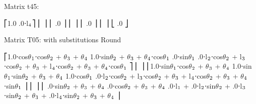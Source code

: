 \documentclass[letterpaper,10pt,english,openany,oneside]{sphinxmanual}
\begin{document}
\begin{sphinxVerbatim}[commandchars=\\\{\}]
Matrix t\PYGZus{}4\PYGZus{}5:

⎡1.0          .0⋅l\(\sb{\text{4}}\)⎤
⎢                     ⎥
⎢    .0           ⎥
⎢                     ⎥
⎢        .0       ⎥
⎢                     ⎥
⎣             .0  ⎦


Matrix T\PYGZus{}0\PYGZus{}5: with substitutions Round

⎡1.0⋅cos\(\theta\)\(\sb{\text{1}}\)⋅cos\(\theta\)\(\sb{\text{2}}\) + \(\theta\)\(\sb{\text{3}}\) + \(\theta\)\(\sb{\text{4}}\)  \PYGZhy{}1.0⋅sin\(\theta\)\(\sb{\text{2}}\) + \(\theta\)\(\sb{\text{3}}\) + \(\theta\)\(\sb{\text{4}}\)⋅cos\(\theta\)\(\sb{\text{1}}\)  .0⋅sin\(\theta\)\(\sb{\text{1}}\)      .0⋅l\(\sb{\text{2}}\)⋅cos\(\theta\)\(\sb{\text{2}}\) + l\(\sb{\text{3}}\)⋅cos\(\theta\)\(\sb{\text{2}}\) + \(\theta\)\(\sb{\text{3}}\) + l\(\sb{\text{4}}\)⋅cos\(\theta\)\(\sb{\text{2}}\) + \(\theta\)\(\sb{\text{3}}\) + \(\theta\)\(\sb{\text{4}}\)⋅cos\(\theta\)\(\sb{\text{1}}\)        ⎤
⎢                                                                                                                                                     ⎥
⎢1.0⋅sin\(\theta\)\(\sb{\text{1}}\)⋅cos\(\theta\)\(\sb{\text{2}}\) + \(\theta\)\(\sb{\text{3}}\) + \(\theta\)\(\sb{\text{4}}\)  \PYGZhy{}1.0⋅sin\(\theta\)\(\sb{\text{1}}\)⋅sin\(\theta\)\(\sb{\text{2}}\) + \(\theta\)\(\sb{\text{3}}\) + \(\theta\)\(\sb{\text{4}}\)  \PYGZhy{}1.0⋅cos\(\theta\)\(\sb{\text{1}}\)     .0⋅l\(\sb{\text{2}}\)⋅cos\(\theta\)\(\sb{\text{2}}\) + l\(\sb{\text{3}}\)⋅cos\(\theta\)\(\sb{\text{2}}\) + \(\theta\)\(\sb{\text{3}}\) + l\(\sb{\text{4}}\)⋅cos\(\theta\)\(\sb{\text{2}}\) + \(\theta\)\(\sb{\text{3}}\) + \(\theta\)\(\sb{\text{4}}\)⋅sin\(\theta\)\(\sb{\text{1}}\)        ⎥
⎢                                                                                                                                                     ⎥
⎢    .0⋅sin\(\theta\)\(\sb{\text{2}}\) + \(\theta\)\(\sb{\text{3}}\) + \(\theta\)\(\sb{\text{4}}\)          .0⋅cos\(\theta\)\(\sb{\text{2}}\) + \(\theta\)\(\sb{\text{3}}\) + \(\theta\)\(\sb{\text{4}}\)                    .0⋅l\(\sb{\text{1}}\) + .0⋅l\(\sb{\text{2}}\)⋅sin\(\theta\)\(\sb{\text{2}}\) + .0⋅l\(\sb{\text{3}}\)⋅sin\(\theta\)\(\sb{\text{2}}\) + \(\theta\)\(\sb{\text{3}}\) + .0⋅l\(\sb{\text{4}}\)⋅sin\(\theta\)\(\sb{\text{2}}\) + \(\theta\)\(\sb{\text{3}}\) + \(\theta\)\(\sb{\text{4}}\)    ⎥

\end{sphinxVerbatim}
\end{document}
